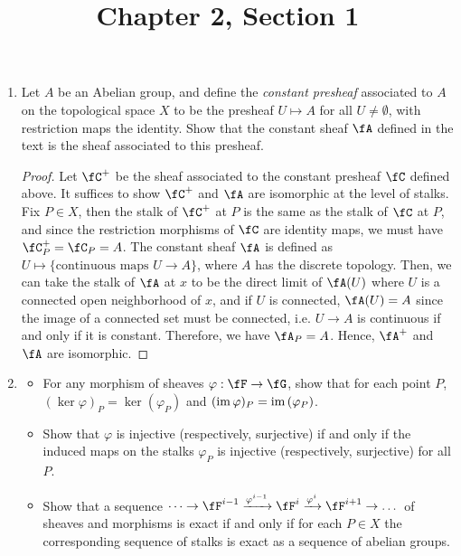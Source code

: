 \documentclass[a4paper]{article}
\title{Chapter 2, Section 1}
\begin{document}
\maketitle

\begin{enumerate} [label=\textbf{\arabic*.}, leftmargin=0em]

    \item Let $A$ be an Abelian group, and define the \textit{constant presheaf} associated to $A$ on the topological space $X$ to be the presheaf $U \mapsto A$ for all $U \neq \emptyset$, with restriction maps the identity. Show that the constant sheaf $\fA$ defined in the text is the sheaf associated to this presheaf.

          \begin{proof}
              Let $\fC^+$ be the sheaf associated to the constant presheaf $\fC$ defined above.
              It suffices to show $\fC^+$ and $\fA$ are isomorphic at the level of stalks.
              Fix $P \in X$, then the stalk of $\fC^+$ at $P$ is the same as the stalk of $\fC$ at $P$, and since the restriction morphisms of $\fC$ are identity maps, we must have $\fC^+_P = \fC_P = A$.
              The constant sheaf $\fA$ is defined as $U \mapsto \{\text{continuous maps $U \to A$}\}$, where $A$ has the discrete topology.
              Then, we can take the stalk of $\fA$ at $x$ to be the direct limit of $\fA(U)$ where $U$ is a connected open neighborhood of $x$, and if $U$ is connected, $\fA(U) = A$ since the image of a connected set must be connected, i.e. $U \to A$ is continuous if and only if it is constant.
              Therefore, we have $\fA_P = A$. Hence, $\fA^+$ and $\fA$ are isomorphic.
          \end{proof}

    \item \begin{itemize}
              \item[(a)] For any morphism of sheaves $\varphi : \fF \to \fG$, show that for each point $P$, $(\ker{\varphi})_P = \ker{(\varphi_P)}$ and $(\operatorname{im}{\varphi})_P = \operatorname{im}{(\varphi_P)}$.
              \item[(b)] Show that $\varphi$ is injective (respectively, surjective) if and only if the induced maps on the stalks $\varphi_P$ is injective (respectively, surjective) for all $P$.
              \item[(c)] Show that a sequence $\dots \to \fF^{i - 1} \xrightarrow{\varphi^{i - 1}} \fF^i \xrightarrow{\varphi^i} \fF^{i + 1} \to \dots$ of sheaves and morphisms is exact if and only if for each $P \in X$ the corresponding sequence of stalks is exact as a sequence of abelian groups.
          \end{itemize}


\end{enumerate}
\end{document}
